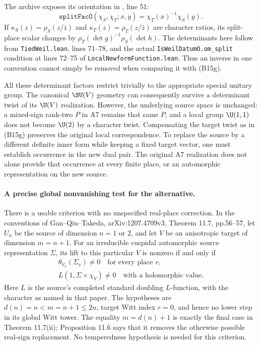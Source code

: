 \documentclass[11pt]{article}
\theoremstyle{definition}\newtheorem{definition}[theorem]{Definition}\newtheorem{remark}[theorem]{Remark}
\begin{document}
The archive exposes its orientation in
, line 51:
\[
 \texttt{splitFacO}(\chi_S,\chi_T;x,y)=\chi_T(x)^{-1}\chi_S(y).
 \tag{B15h}
\]
If $\kappa_S(z)=\rho_S(z/\bar z)$ and $\kappa_T(z)=\rho_T(z/\bar z)$ are character ratios, its split-place scalar changes by
$\rho_T(\det g)^{-1}\rho_S(\det h)$.
The determinants here follow from \texttt{TiedWeil.lean}, lines 71--78, and the actual \nolinkurl{IsWeilDatumO.om_split} condition at lines 72--75 of \nolinkurl{LocalNewformFunction.lean}. Thus an inverse in one convention cannot simply be removed when comparing it with (B15g).

All these determinant factors restrict trivially to the appropriate special unitary group. The canonical $\SU(V)$ geometry can consequently survive a determinant twist of its $\U(V)$ realization. However, the underlying source space is unchanged: a mixed-sign rank-two $P$ in A7 remains that same $P$, and a local group $\U(1,1)$ does not become $\U(2)$ by a character twist. Compensating the target twist as in (B15g) preserves the original local correspondence. To replace the source by a different definite inner form while keeping a fixed target vector, one must establish occurrence in the new dual pair. The original A7 realization does not alone provide that occurrence at every finite place, or an automorphic representation on the new source.

\paragraph{A precise global nonvanishing test for the alternative.}
There is a usable criterion with no unspecified real-place correction. In the conventions of Gan--Qiu--Takeda, arXiv:1207.4709v3, Theorem 11.7, pp.56--57, let $U_n$ be the source of dimension $n=1$ or $2$, and let $V$ be an anisotropic target of dimension $m=n+1$. For an irreducible cuspidal automorphic source representation $\Sigma$, its lift to this particular $V$ is nonzero if and only if
\begin{equation}
\begin{gathered}
 \theta_{V_v}(\Sigma_v)\ne0\quad\text{for every place }v,
 \\ L(1,\Sigma\times\chi_V)\ne0
       \quad\text{with a holomorphic value}.
\end{gathered}
 \tag{B15i}
\end{equation}
Here $L$ is the source's completed standard doubling $L$-function, with the character as named in that paper. The hypotheses are $d(n)=n<m=n+1\leq2n$, target Witt index $r=0$, and hence no lower step in its global Witt tower. The equality $m=d(n)+1$ is exactly the final case in Theorem 11.7(ii); Proposition 11.6 says that it removes the otherwise possible real-sign replacement. No temperedness hypothesis is needed for this criterion.
\end{document}
